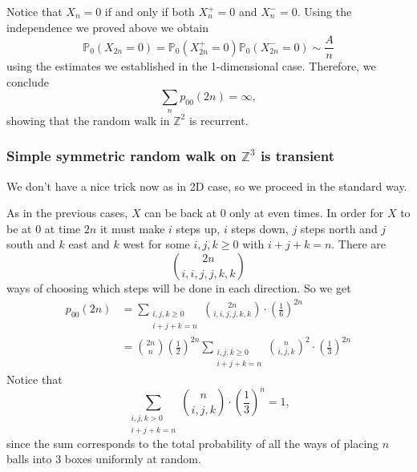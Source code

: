 \documentclass[a4paper,11pt]{article}
\begin{document}
Notice that $X_n=0$ if and only if both $X_n^{+}=0$ and $X_n^{-}=0$. Using the independence we proved above we obtain
\[
\mathbb{P}_0\left(X_{2 n}=0\right)=\mathbb{P}_0\left(X_{2 n}^{+}=0\right) \mathbb{P}_0\left(X_{2 n}^{-}=0\right) \sim \frac{A}{n}
\]
using the estimates we established in the 1-dimensional case. Therefore, we conclude
\[
\sum_n p_{00}(2 n)=\infty,
\]
showing that the random walk in $\mathbb{Z}^2$ is recurrent.

\subsubsection*{Simple symmetric random walk on $\mathbb{Z}^3$ is transient}

We don't have a nice trick now as in 2D case, so we proceed in the standard way. 

As in the previous cases, $X$ can be back at 0 only at even times. In order for $X$ to be at 0 at time $2 n$ it must make $i$ steps up, $i$ steps down, $j$ steps north and $j$ south and $k$ east and $k$ west for some $i, j, k \geq 0$ with $i+j+k=n$. There are 
\[
    \binom{2n}{i,i,j,j,k,k}
\]
 ways of choosing which steps will be done in each direction. So we get
\begin{align*}
    p_{00}(2 n)&=\sum_{\substack{i, j, k \geq 0 \\
    i+j+k=n}}\binom{2n}{i,i,j,j,k,k} \cdot\left(\frac{1}{6}\right)^{2 n}\\ 
    &=\binom{2n}{n}\left(\frac{1}{2}\right)^{2 n} \sum_{\substack{i, j, k \geq 0 \\
    i+j+k=n}}\binom{n}{i,j,k}^2 \cdot\left(\frac{1}{3}\right)^{2 n}
\end{align*}
Notice that
\[
\sum_{\substack{i, j, k>0 \\
i+j+k=n}}\binom{n}{i,j,k} \cdot\left(\frac{1}{3}\right)^n=1,
\]
since the sum corresponds to the total probability of all the ways of placing $n$ balls into 3 boxes uniformly at random. 
\end{document}
